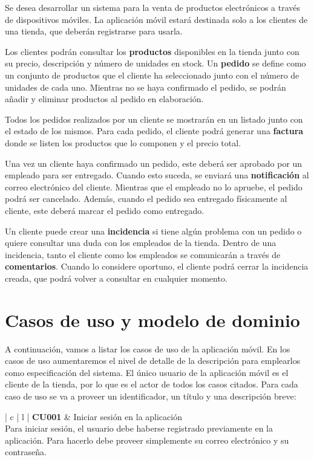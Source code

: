 \documentclass[11pt,spanish,listoffigures]{tfgetsinf}
\begin{document}
Se desea desarrollar un sistema para la venta de productos electrónicos a través de dispositivos móviles. La aplicación móvil estará destinada solo a los clientes de una tienda, que deberán registrarse para usarla.

Los clientes podrán consultar los \textbf{productos} disponibles en la tienda junto con su precio, descripción y número de unidades en stock. Un \textbf{pedido} se define como un conjunto de productos que el cliente ha seleccionado junto con el número de unidades de cada uno. Mientras no se haya confirmado el pedido, se podrán añadir y eliminar productos al pedido en elaboración.

Todos los pedidos realizados por un cliente se mostrarán en un listado junto con el estado de los mismos. Para cada pedido, el cliente podrá generar una \textbf{factura} donde se listen los productos que lo componen y el precio total.

Una vez un cliente haya confirmado un pedido, este deberá ser aprobado por un empleado para ser entregado. Cuando esto suceda, se enviará una \textbf{notificación} al correo electrónico del cliente. Mientras que el empleado no lo apruebe, el pedido podrá ser cancelado. Además, cuando el pedido sea entregado físicamente al cliente, este deberá marcar el pedido como entregado.

Un cliente puede crear una \textbf{incidencia} si tiene algún problema con un pedido o quiere consultar una duda con los empleados de la tienda. Dentro de una incidencia, tanto el cliente como los empleados se comunicarán a través de \textbf{comentarios}. Cuando lo considere oportuno, el cliente podrá cerrar la incidencia creada, que podrá volver a consultar en cualquier momento.

\section{Casos de uso y modelo de dominio} \label{sect:CUs}

A continuación, vamos a listar los casos de uso de la aplicación móvil. En los casos de uso aumentaremos el nivel de detalle de la descripción para emplearlos como especificación del sistema. El único usuario de la aplicación móvil es el cliente de la tienda, por lo que es el actor de todos los casos citados. Para cada caso de uso se va a proveer un identificador, un título y una descripción breve:

\begin{center}
\begin{tabular}{ | c | l | }
\hline
\textbf{ CU001 } & Iniciar sesión en la aplicación \\
\hline
{}
{
Para iniciar sesión, el usuario debe haberse registrado previamente en la aplicación. Para hacerlo debe proveer simplemente su correo electrónico y su contraseña.
} \\
\hline
\end{tabular}
\end{center}
\end{document}
